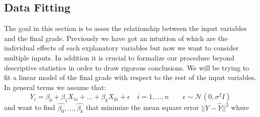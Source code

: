 \documentclass[a4paper, 11pt]{report}
\theoremstyle{definition}
\numberwithin{equation}{section}		%
\numberwithin{figure}{section}			%
\numberwithin{table}{section}				%
\begin{document}
\subsection{Data Fitting}
The goal in this section is to asses the relationship between the input variables and the final grade. Previously we have got an intuition of which are the individual effects of each explanatory variables but now we want to consider multiple inputs. In addition it is crucial to formalize our procedure beyond descriptive statistics in order to draw rigorous conclusions. We will be trying to fit a linear model of the final grade with respect to the rest of the input variables. In general terms we assume that:
$$
Y_i = \beta_0 + \beta_1X_{1i} + ... +\beta_kX_{ki} + \epsilon \quad i = 1,...,n \quad \quad \epsilon \sim \mathcal{N}(0, \sigma^2I)
$$
and want to find $\hat{\beta_0},...,\hat{\beta_k}$ that minimize the mean square error $||Y-\hat{Y}||^2$ where
\end{document}
